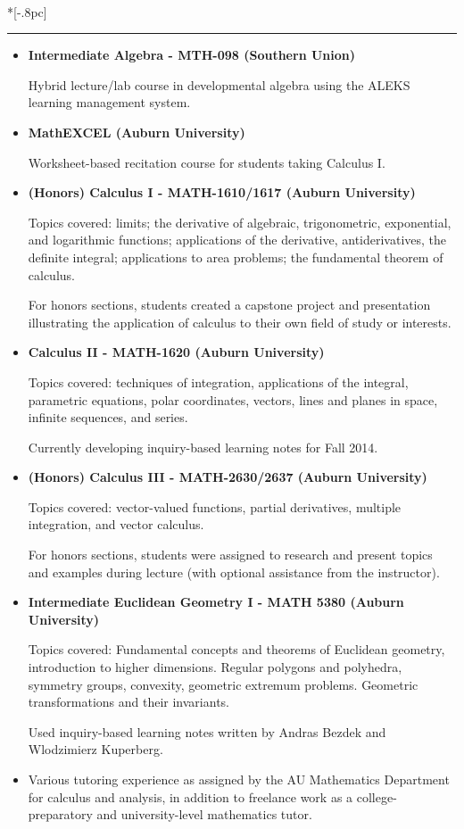 \documentclass{article}
\newcommand{\headerText}[1]{
  \noindent{\large \bf #1} \\*[-.8pc]
  \rule{\textwidth}{.1pt}}
\begin{document}
\headerText{Teaching}
\begin{itemize}
  \item
    \textbf{Intermediate Algebra - MTH-098 (Southern Union)}

    Hybrid lecture/lab course in
    developmental algebra using the ALEKS learning management system.

  \item
    \textbf{MathEXCEL (Auburn University)}

    Worksheet-based recitation course for students taking Calculus I.

  \item
    \textbf{(Honors) Calculus I - MATH-1610/1617 (Auburn University)}

    Topics covered: limits; the derivative of algebraic, trigonometric,
    exponential, and logarithmic functions; applications of the derivative,
    antiderivatives, the definite integral; applications to area problems;
    the fundamental theorem of calculus.

    For honors sections, students
    created a capstone project and presentation illustrating the application
    of calculus to their own field of study or interests.

  \item
    \textbf{Calculus II - MATH-1620 (Auburn University)}

    Topics covered: techniques of integration, applications of the integral,
    parametric equations, polar coordinates, vectors, lines and planes in space,
    infinite sequences, and series.

    Currently developing inquiry-based learning notes for Fall 2014.

  \item
    \textbf{(Honors) Calculus III - MATH-2630/2637 (Auburn University)}

    Topics covered: vector-valued functions, partial derivatives,
    multiple integration, and vector calculus.

    For honors sections, students were assigned to research and present
    topics and examples during lecture (with optional assistance from the
    instructor).

  \item
    \textbf{Intermediate Euclidean Geometry I - MATH 5380 (Auburn University)}

    Topics covered: Fundamental concepts and theorems of Euclidean geometry,
    introduction to higher dimensions. Regular polygons and polyhedra,
    symmetry groups, convexity, geometric extremum problems. Geometric
    transformations and their invariants.

    Used inquiry-based learning notes written by Andras Bezdek and
    Wlodzimierz Kuperberg.

  \item
    Various tutoring experience as assigned by the AU Mathematics Department
    for calculus and analysis, in addition to freelance work as a
    college-preparatory and university-level mathematics tutor.

\end{itemize}
\end{document}
